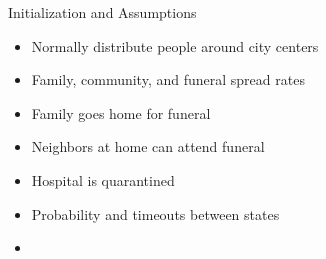 \documentclass[30pt]{beamer}
\begin{document}

%
%
%      
%       
%        

\begin{frame}{Initialization and Assumptions}
\begin{itemize}
\item Normally distribute people around city centers
\item Family, community, and funeral spread rates
\item Family goes home for funeral
\item Neighbors at home can attend funeral
\item Hospital is quarantined
\item Probability and timeouts between states
\item 
\end{itemize}
\end{frame}
\end{document}
